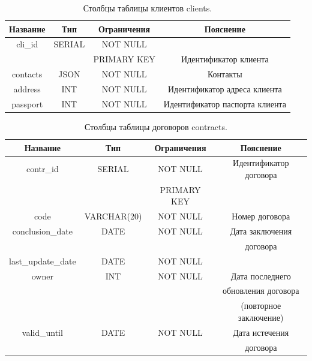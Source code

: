 \documentclass[a4paper,14pt]{article}
\begin{document}
\newpage
\begin{table}[!h]
	\caption{Столбцы таблицы клиентов clients.}
	\begin{center}
		\begin{tabular}{| c | c | c | c |}
	 	\hline
		Название & Тип & Ограничения & Пояснение \\ \hline
		cli\_id & SERIAL & NOT NULL &  \\
		 &  & PRIMARY KEY & Идентификатор клиента \\ \hline
		contacts & JSON & NOT NULL & Контакты \\ \hline
		address & INT & NOT NULL & Идентификатор адреса клиента \\ \hline
		passport & INT & NOT NULL & Идентификатор паспорта клиента \\ \hline
	\end{tabular}
	\end{center}
\end{table}

\begin{table}[!h]
	\caption{Столбцы таблицы договоров contracts.}
	\begin{center}
		\begin{tabular}{| c | c | c | c |}
	 	\hline
		Название & Тип & Ограничения & Пояснение \\ \hline
		contr\_id & SERIAL & NOT NULL & Идентификатор договора \\
		 &  & PRIMARY KEY &  \\ \hline
		code & VARCHAR(20) & NOT NULL & Номер договора \\ \hline
		conclusion\_date & DATE & NOT NULL & Дата заключения \\  &  &  & договора \\ \hline
		last\_update\_date & DATE & NOT NULL &  \\ \hline
		owner & INT & NOT NULL & Дата последнего \\ 
		 &  &  & обновления договора \\
		 &  &  & (повторное заключение) \\ \hline
		valid\_until & DATE & NOT NULL & Дата истечения \\
		 &  &  & договора \\ \hline
	\end{tabular}
	\end{center}
\end{table}
\end{document}
